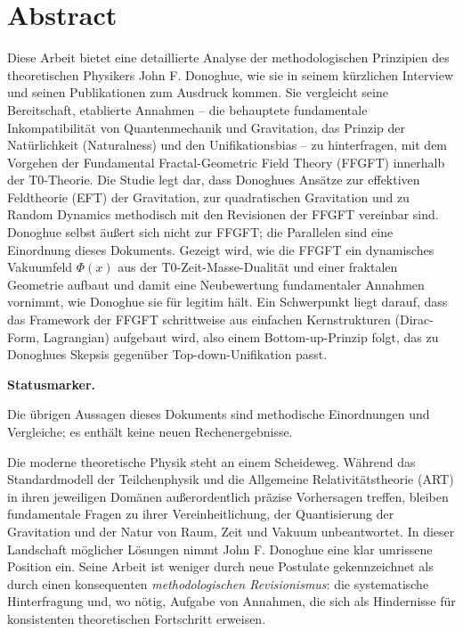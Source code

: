 
\section*{Abstract}
		Diese Arbeit bietet eine detaillierte Analyse der methodologischen Prinzipien des theoretischen Physikers John F. Donoghue, wie sie in seinem kürzlichen Interview \cite{DonoghueInterview2025} und seinen Publikationen zum Ausdruck kommen. Sie vergleicht seine Bereitschaft, etablierte Annahmen – die behauptete fundamentale Inkompatibilität von Quantenmechanik und Gravitation, das Prinzip der Natürlichkeit (Naturalness) und den Unifikationsbias – zu hinterfragen, mit dem Vorgehen der Fundamental Fractal-Geometric Field Theory (FFGFT) innerhalb der T0-Theorie. Die Studie legt dar, dass Donoghues Ansätze zur effektiven Feldtheorie (EFT) der Gravitation, zur quadratischen Gravitation und zu Random Dynamics methodisch mit den Revisionen der FFGFT vereinbar sind. Donoghue selbst äußert sich nicht zur FFGFT; die Parallelen sind eine Einordnung dieses Dokuments. Gezeigt wird, wie die FFGFT ein dynamisches Vakuumfeld $\Phi(x)$ aus der T0-Zeit-Masse-Dualität und einer fraktalen Geometrie aufbaut und damit eine Neubewertung fundamentaler Annahmen vornimmt, wie Donoghue sie für legitim hält. Ein Schwerpunkt liegt darauf, dass das Framework der FFGFT schrittweise aus einfachen Kernstrukturen (Dirac-Form, Lagrangian) aufgebaut wird, also einem Bottom-up-Prinzip folgt, das zu Donoghues Skepsis gegenüber Top-down-Unifikation passt.

		\medskip\noindent\textbf{Statusmarker.}
		

		\noindent Die übrigen Aussagen dieses Dokuments sind methodische Einordnungen und Vergleiche; es enthält keine neuen Rechenergebnisse.

	
	
	
	Die moderne theoretische Physik steht an einem Scheideweg. Während das Standardmodell der Teilchenphysik und die Allgemeine Relativitätstheorie (ART) in ihren jeweiligen Domänen außerordentlich präzise Vorhersagen treffen, bleiben fundamentale Fragen zu ihrer Vereinheitlichung, der Quantisierung der Gravitation und der Natur von Raum, Zeit und Vakuum unbeantwortet. In dieser Landschaft möglicher Lösungen nimmt John F. Donoghue eine klar umrissene Position ein. Seine Arbeit ist weniger durch neue Postulate gekennzeichnet als durch einen konsequenten \emph{methodologischen Revisionismus}: die systematische Hinterfragung und, wo nötig, Aufgabe von Annahmen, die sich als Hindernisse für konsistenten theoretischen Fortschritt erweisen.
	
